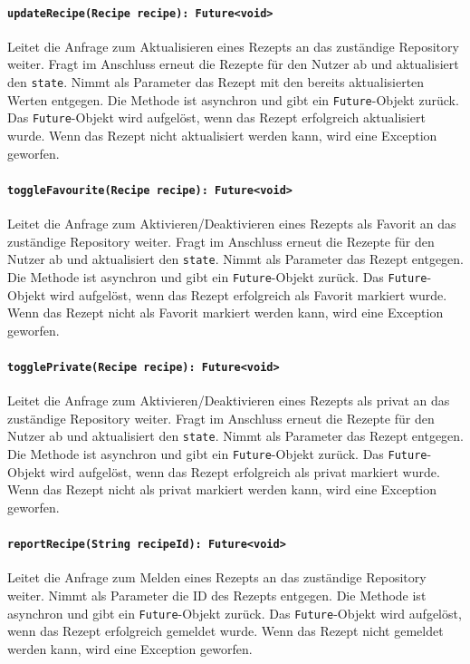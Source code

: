\documentclass{entwurfsheft}
\begin{document}
\paragraph{\texttt{updateRecipe(Recipe recipe): Future<void>}}
Leitet die Anfrage zum Aktualisieren eines Rezepts an das zuständige Repository weiter. Fragt im Anschluss erneut die Rezepte für den Nutzer ab und aktualisiert den \texttt{state}. Nimmt als Parameter das Rezept mit den bereits aktualisierten Werten entgegen. Die Methode ist asynchron und gibt ein \texttt{Future}-Objekt zurück. Das \texttt{Future}-Objekt wird aufgelöst, wenn das Rezept erfolgreich aktualisiert wurde. Wenn das Rezept nicht aktualisiert werden kann, wird eine Exception geworfen.
\paragraph{\texttt{toggleFavourite(Recipe recipe): Future<void>}}
Leitet die Anfrage zum Aktivieren/De\-aktivieren eines Rezepts als Favorit an das zuständige Repository weiter. Fragt im Anschluss erneut die Rezepte für den Nutzer ab und aktualisiert den \texttt{state}. Nimmt als Parameter das Rezept entgegen. Die Methode ist asynchron und gibt ein \texttt{Future}-Objekt zurück. Das \texttt{Future}-Objekt wird aufgelöst, wenn das Rezept erfolgreich als Favorit markiert wurde. Wenn das Rezept nicht als Favorit markiert werden kann, wird eine Exception geworfen.
\paragraph{\texttt{togglePrivate(Recipe recipe): Future<void>}}
Leitet die Anfrage zum Aktivieren/Deak\-ti\-vieren eines Rezepts als privat an das zuständige Repository weiter. Fragt im Anschluss erneut die Rezepte für den Nutzer ab und aktualisiert den \texttt{state}. Nimmt als Parameter das Rezept entgegen. Die Methode ist asynchron und gibt ein \texttt{Future}-Objekt zurück. Das \texttt{Future}-Objekt wird aufgelöst, wenn das Rezept erfolgreich als privat markiert wurde. Wenn das Rezept nicht als privat markiert werden kann, wird eine Exception geworfen.
\paragraph{\texttt{reportRecipe(String recipeId): Future<void>}}
Leitet die Anfrage zum Melden eines Rezepts an das zuständige Repository weiter. Nimmt als Parameter die ID des Rezepts entgegen. Die Methode ist asynchron und gibt ein \texttt{Future}-Objekt zurück. Das \texttt{Future}-Objekt wird aufgelöst, wenn das Rezept erfolgreich gemeldet wurde. Wenn das Rezept nicht gemeldet werden kann, wird eine Exception geworfen.
\end{document}
